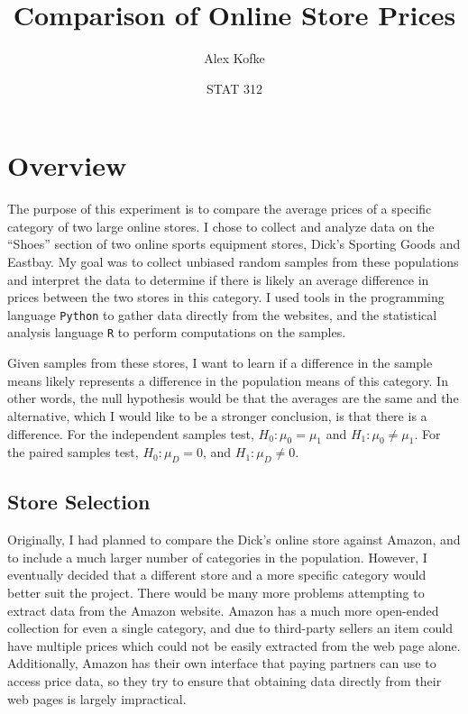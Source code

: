 \documentclass[12pt]{article}
\begin{document}
\begin{titlepage}
\title{Comparison of Online Store Prices} %
\author{Alex Kofke}
\date{STAT 312}
\maketitle
\end{titlepage}



\section{Overview}
The purpose of this experiment is to compare the average prices of a specific category of two large online stores. I chose to collect and analyze data on the ``Shoes'' section of two
online sports equipment stores, Dick's Sporting Goods and Eastbay. My goal was to collect unbiased random samples from these populations and interpret the data to determine
if there is likely an average difference in prices between the two stores in this category. I used tools in the programming language \texttt{Python} to gather data directly from the websites,
and the statistical analysis language \texttt{R} to perform computations on the samples.

Given samples from these stores, I want to learn if a difference in the sample means likely represents a difference in the population means of this category. In other words, the
null hypothesis would be that the averages are the same and the alternative, which I would like to be a stronger conclusion, is that there is a difference. For the independent samples
test, $H_0: \mu_0 = \mu_1$ and $H_1: \mu_0 \neq \mu_1$. For the paired samples test, $H_0: \mu_D = 0$, and $H_1: \mu_D \neq 0$.

\subsection{Store Selection}
Originally, I had planned to compare the Dick's online store against Amazon, and to include a much larger number of categories in the population. However, I eventually decided that
a different store and a more specific category would better suit the project. There would be many more problems attempting to extract data from the Amazon website. Amazon has a much
more open-ended collection for even a single category, and due to third-party sellers an item could have multiple prices which could not be easily extracted from the web page alone.
Additionally, Amazon has their own interface that paying partners can use to access price data, so they try to ensure that obtaining data directly from their web pages is largely 
impractical.
\end{document}
